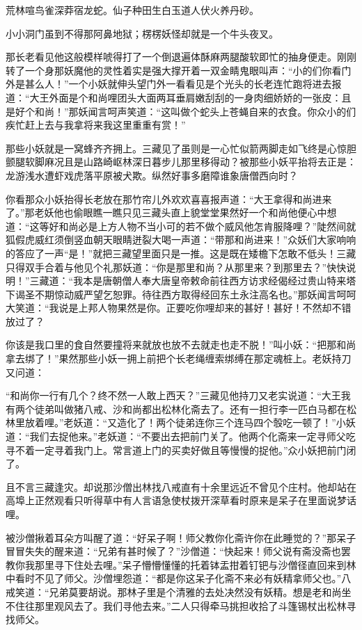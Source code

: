 \documentclass[12pt,UTF8]{ctexbook}
\begin{document}
荒林喧鸟雀深莽宿龙蛇。仙子种田生白玉道人伏火养丹砂。

小小洞门虽到不得那阿鼻地狱；楞楞妖怪却就是一个牛头夜叉。

那长老看见他这般模样唬得打了一个倒退遍体酥麻两腿酸软即忙的抽身便走。刚刚转了一个身那妖魔他的灵性着实是强大撑开着一双金睛鬼眼叫声：“小的们你看门外是甚么人！”一个小妖就伸头望门外一看看见是个光头的长老连忙跑将进去报道：“大王外面是个和尚哩团头大面两耳垂肩嫩刮刮的一身肉细娇娇的一张皮：且是好个和尚！”那妖闻言呵声笑道：“这叫做个蛇头上苍蝇自来的衣食。你众小的们疾忙赶上去与我拿将来我这里重重有赏！”

那些小妖就是一窝蜂齐齐拥上。三藏见了虽则是一心忙似箭两脚走如飞终是心惊胆颤腿软脚麻况且是山路崎岖林深日暮步儿那里移得动？被那些小妖平抬将去正是：龙游浅水遭虾戏虎落平原被犬欺。纵然好事多磨障谁象唐僧西向时？

你看那众小妖抬得长老放在那竹帘儿外欢欢喜喜报声道：“大王拿得和尚进来了。”那老妖他也偷眼瞧一瞧只见三藏头直上貌堂堂果然好一个和尚他便心中想道：“这等好和尚必是上方人物不当小可的若不做个威风他怎肯服降哩？”陡然间就狐假虎威红须倒竖血朝天眼睛迸裂大喝一声道：“带那和尚进来！”众妖们大家响响的答应了一声“是！”就把三藏望里面只是一推。这是既在矮檐下怎敢不低头！三藏只得双手合着与他见个礼那妖道：“你是那里和尚？从那里来？到那里去？”快快说明！”三藏道：“我本是唐朝僧人奉大唐皇帝敕命前往西方访求经偈经过贵山特来塔下谒圣不期惊动威严望乞恕罪。待往西方取得经回东土永注高名也。”那妖闻言呵呵大笑道：“我说是上邦人物果然是你。正要吃你哩却来的甚好！甚好！不然却不错放过了？

你该是我口里的食自然要撞将来就放也放不去就走也走不脱！”叫小妖：“把那和尚拿去绑了！”果然那些小妖一拥上前把个长老绳缠索绑缚在那定魂桩上。老妖持刀又问道：

“和尚你一行有几个？终不然一人敢上西天？”三藏见他持刀又老实说道：“大王我有两个徒弟叫做猪八戒、沙和尚都出松林化斋去了。还有一担行李一匹白马都在松林里放着哩。”老妖道：“又造化了！两个徒弟连你三个连马四个彀吃一顿了！”小妖道：“我们去捉他来。”老妖道：“不要出去把前门关了。他两个化斋来一定寻师父吃寻不着一定寻着我门上。常言道上门的买卖好做且等慢慢的捉他。”众小妖把前门闭了。

且不言三藏逢灾。却说那沙僧出林找八戒直有十余里远近不曾见个庄村。他却站在高埠上正然观看只听得草中有人言语急使杖拨开深草看时原来是呆子在里面说梦话哩。

被沙僧揪着耳朵方叫醒了道：“好呆子啊！师父教你化斋许你在此睡觉的？”那呆子冒冒失失的醒来道：“兄弟有甚时候了？”沙僧道：“快起来！师父说有斋没斋也罢教你我那里寻下住处去哩。”呆子懵懵懂懂的托着钵盂拑着钉钯与沙僧径直回来到林中看时不见了师父。沙僧埋怨道：“都是你这呆子化斋不来必有妖精拿师父也。”八戒笑道：“兄弟莫要胡说。那林子里是个清雅的去处决然没有妖精。想是老和尚坐不住往那里观风去了。我们寻他去来。”二人只得牵马挑担收拾了斗篷锡杖出松林寻找师父。
\end{document}
